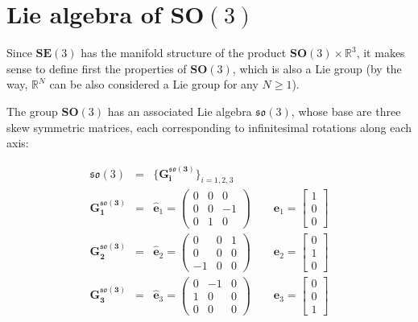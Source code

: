 \documentclass[a4paper,11pt]{report}
\begin{document}
\section{Lie algebra of $\mathbf{SO}(3)$}

Since $\mathbf{SE}(3)$ has the manifold structure of the product
$\mathbf{SO}(3) \times \mathbb{R}^3$, it makes sense to define first
the properties of $\mathbf{SO}(3)$, which is also a Lie group
(by the way, $\mathbb{R}^N$ can be also considered a Lie group for any $N \geq 1$).


The group $\mathbf{SO}(3)$ has an associated Lie algebra $\mathfrak{so}(3)$,
whose base are three skew symmetric matrices, each corresponding to
infinitesimal rotations along each axis:

\begin{eqnarray}
\mathfrak{so}(3) &=& \{  \mathbf{G^{\mathfrak{so}(3)}_i} \}_{i=1,2,3}  \\
\mathbf{G^{\mathfrak{so}(3)}_1} &=& \hat{\mathbf{e}}_1
=
\left(
\begin{array}{ccc}
0 & 0 & 0  \\
0 & 0 & -1  \\
0 & 1 & 0
\end{array}
\right) 
\quad\quad
\mathbf{e}_1 = \left[ \begin{array}{c} 1 \\ 0 \\0 \end{array} \right]
\\
\mathbf{G^{\mathfrak{so}(3)}_2} &=& \hat{\mathbf{e}}_2
=
\left(
\begin{array}{ccc}
0 & 0 & 1  \\
0 & 0 & 0  \\
-1 & 0 & 0
\end{array}
\right)
\quad\quad
\mathbf{e}_2 = \left[ \begin{array}{c} 0 \\ 1 \\0 \end{array} \right]
\\
\mathbf{G^{\mathfrak{so}(3)}_3} &=& \hat{\mathbf{e}}_3
=
\left(
\begin{array}{ccc}
0 & -1 & 0  \\
1 & 0 & 0  \\
0 & 0 & 0
\end{array}
\right)
\quad\quad
\mathbf{e}_3 = \left[ \begin{array}{c} 0 \\ 0 \\1 \end{array} \right]
\\
\end{eqnarray}
\end{document}
